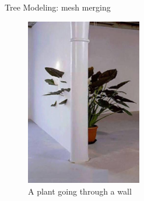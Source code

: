\documentclass[10pt]{beamer}
\begin{document}
\begin{frame}{Tree Modeling: mesh merging}
	\begin{figure}
		\centering
		\includegraphics[width=0.45\textwidth]{images/plants_wall.jpg}
		\caption{A plant going through a wall}
		\label{fig:figure1}
	\end{figure}
\end{frame}
\end{document}
